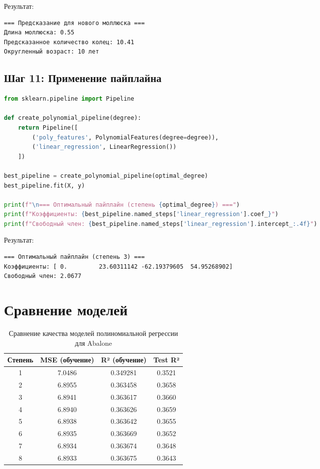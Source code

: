 Результат:

\begin{verbatim}
=== Предсказание для нового моллюска ===
Длина моллюска: 0.55
Предсказанное количество колец: 10.41
Округленный возраст: 10 лет
\end{verbatim}

\subsection{Шаг 11: Применение пайплайна}

\begin{lstlisting}[language=Python, caption=Использование Pipeline]
from sklearn.pipeline import Pipeline

def create_polynomial_pipeline(degree):
    return Pipeline([
        ('poly_features', PolynomialFeatures(degree=degree)),
        ('linear_regression', LinearRegression())
    ])

best_pipeline = create_polynomial_pipeline(optimal_degree)
best_pipeline.fit(X, y)

print(f"\n=== Оптимальный пайплайн (степень {optimal_degree}) ===")
print(f"Коэффициенты: {best_pipeline.named_steps['linear_regression'].coef_}")
print(f"Свободный член: {best_pipeline.named_steps['linear_regression'].intercept_:.4f}")
\end{lstlisting}

Результат:

\begin{verbatim}
=== Оптимальный пайплайн (степень 3) ===
Коэффициенты: [ 0.         23.60311142 -62.19379605  54.95268902]
Свободный член: 2.0677
\end{verbatim}

\section{Сравнение моделей}

\begin{table}[h]
\centering
\caption{Сравнение качества моделей полиномиальной регрессии для Abalone}
\label{tab:model_comparison}
\begin{tabular}{|c|c|c|c|}
\hline
\textbf{Степень} & \textbf{MSE (обучение)} & \textbf{R² (обучение)} & \textbf{Test R²} \\
\hline
1 & 7.0486 & 0.349281 & 0.3521 \\
2 & 6.8955 & 0.363458 & 0.3658 \\
3 & 6.8941 & 0.363617 & 0.3660 \\
4 & 6.8940 & 0.363626 & 0.3659 \\
5 & 6.8938 & 0.363642 & 0.3655 \\
6 & 6.8935 & 0.363669 & 0.3652 \\
7 & 6.8934 & 0.363674 & 0.3648 \\
8 & 6.8933 & 0.363675 & 0.3643 \\
\hline
\end{tabular}
\end{table}

